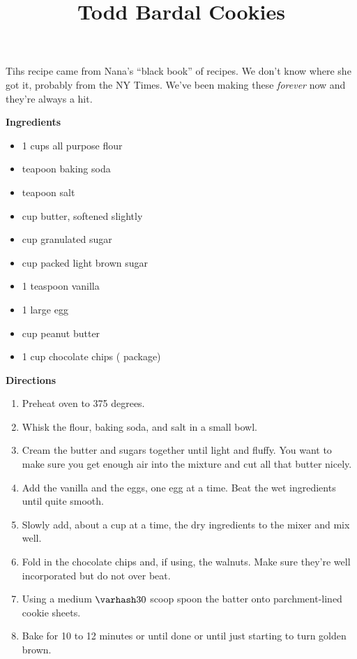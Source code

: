 \documentclass{article}
\title{Todd Bardal Cookies}
\begin{document}
Tihs recipe came from Nana's ``black book'' of recipes. We don't know where she got it, probably
from the NY Times. We've been making these \textit{forever} now and they're always a hit.

\textbf{Ingredients}

\begin{multicols}{2}
    \begin{itemize}
        \item 1 cups all purpose flour
        \item {} teapoon baking soda
        \item {} teapoon salt

        \item {} cup butter, softened slightly
        \item {} cup granulated sugar
        \item {} cup packed light brown sugar

        \item 1 teaspoon vanilla
        \item 1 large egg
        \item {} cup peanut butter
        \item 1 cup chocolate chips ( package)
    \end{itemize}
\end{multicols}

\textbf{Directions}

\begin{enumerate}
    \item Preheat oven to 375 degrees.
    \item Whisk the flour, baking soda, and salt in a small bowl.
    \item Cream the butter and sugars together until light and fluffy. You want to make sure you get
          enough air into the mixture and cut all that butter nicely.
    \item Add the vanilla and the eggs, one egg at a time. Beat the wet ingredients until quite smooth.
    \item Slowly add, about a cup at a time, the dry ingredients to the mixer and mix well.
    \item Fold in the chocolate chips and, if using, the walnuts. Make sure they're well
          incorporated but do not over beat.
    \item Using a medium $\varhash 30$ scoop spoon the batter onto parchment-lined cookie sheets.
    \item Bake for 10 to 12 minutes or until done or until just starting to turn golden brown.
\end{enumerate}

\medskip

\end{document}

